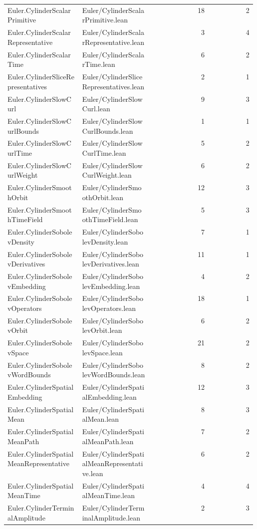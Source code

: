 \begin{longtable}{p{0.30\linewidth}p{0.28\linewidth}rr}
Euler.CylinderScalarPrimitive & Euler/CylinderScalarPrimitive.lean & 18 & 2\\
Euler.CylinderScalarRepresentative & Euler/CylinderScalarRepresentative.lean & 3 & 4\\
Euler.CylinderScalarTime & Euler/CylinderScalarTime.lean & 6 & 2\\
Euler.CylinderSliceRepresentatives & Euler/CylinderSliceRepresentatives.lean & 2 & 1\\
Euler.CylinderSlowCurl & Euler/CylinderSlowCurl.lean & 9 & 3\\
Euler.CylinderSlowCurlBounds & Euler/CylinderSlowCurlBounds.lean & 1 & 1\\
Euler.CylinderSlowCurlTime & Euler/CylinderSlowCurlTime.lean & 5 & 2\\
Euler.CylinderSlowCurlWeight & Euler/CylinderSlowCurlWeight.lean & 6 & 2\\
Euler.CylinderSmoothOrbit & Euler/CylinderSmoothOrbit.lean & 12 & 3\\
Euler.CylinderSmoothTimeField & Euler/CylinderSmoothTimeField.lean & 5 & 3\\
Euler.CylinderSobolevDensity & Euler/CylinderSobolevDensity.lean & 7 & 1\\
Euler.CylinderSobolevDerivatives & Euler/CylinderSobolevDerivatives.lean & 11 & 1\\
Euler.CylinderSobolevEmbedding & Euler/CylinderSobolevEmbedding.lean & 4 & 2\\
Euler.CylinderSobolevOperators & Euler/CylinderSobolevOperators.lean & 18 & 1\\
Euler.CylinderSobolevOrbit & Euler/CylinderSobolevOrbit.lean & 6 & 2\\
Euler.CylinderSobolevSpace & Euler/CylinderSobolevSpace.lean & 21 & 2\\
Euler.CylinderSobolevWordBounds & Euler/CylinderSobolevWordBounds.lean & 8 & 2\\
Euler.CylinderSpatialEmbedding & Euler/CylinderSpatialEmbedding.lean & 12 & 3\\
Euler.CylinderSpatialMean & Euler/CylinderSpatialMean.lean & 8 & 3\\
Euler.CylinderSpatialMeanPath & Euler/CylinderSpatialMeanPath.lean & 7 & 2\\
Euler.CylinderSpatialMeanRepresentative & Euler/CylinderSpatialMeanRepresentative.lean & 6 & 2\\
Euler.CylinderSpatialMeanTime & Euler/CylinderSpatialMeanTime.lean & 4 & 4\\
Euler.CylinderTerminalAmplitude & Euler/CylinderTerminalAmplitude.lean & 2 & 3\\

\end{longtable}
